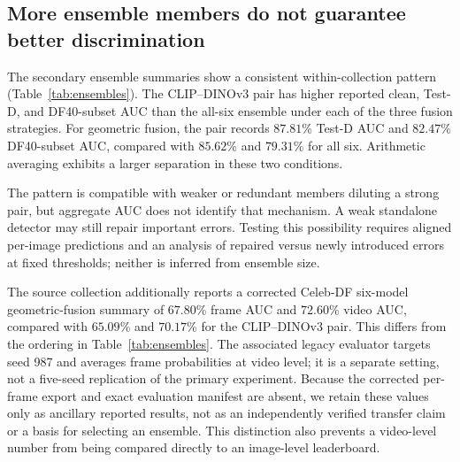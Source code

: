 \documentclass[conference,10pt,letterpaper]{IEEEtran}
\begin{document}
\subsection{More ensemble members do not guarantee better discrimination}
The secondary ensemble summaries show a consistent within-collection pattern (Table~\ref{tab:ensembles}). The CLIP--DINOv3 pair has higher reported clean, Test-D, and DF40-subset AUC than the all-six ensemble under each of the three fusion strategies. For geometric fusion, the pair records $87.81$\% Test-D AUC and $82.47$\% DF40-subset AUC, compared with $85.62$\% and $79.31$\% for all six. Arithmetic averaging exhibits a larger separation in these two conditions.

\begin{table}[t]
\caption{Secondary legacy ensemble summaries: reported mean $\pm$ SD AUC (\%). These aggregates are reproduced from their source table, not recomputed from constituent predictions or pooled with the primary seed cohort. Validation is the stacking fitting set unless independently held out. No ensemble is selected here solely by its best target-test value.}
\label{tab:ensembles}
\centering
\small
\setlength{\tabcolsep}{7pt}

\end{table}

The pattern is compatible with weaker or redundant members diluting a strong pair, but aggregate AUC does not identify that mechanism. A weak standalone detector may still repair important errors. Testing this possibility requires aligned per-image predictions and an analysis of repaired versus newly introduced errors at fixed thresholds; neither is inferred from ensemble size.

The source collection additionally reports a corrected Celeb-DF six-model geometric-fusion summary of $67.80$\% frame AUC and $72.60$\% video AUC, compared with $65.09$\% and $70.17$\% for the CLIP--DINOv3 pair. This differs from the ordering in Table~\ref{tab:ensembles}. The associated legacy evaluator targets seed 987 and averages frame probabilities at video level; it is a separate setting, not a five-seed replication of the primary experiment. Because the corrected per-frame export and exact evaluation manifest are absent, we retain these values only as ancillary reported results, not as an independently verified transfer claim or a basis for selecting an ensemble. This distinction also prevents a video-level number from being compared directly to an image-level leaderboard.
\end{document}
